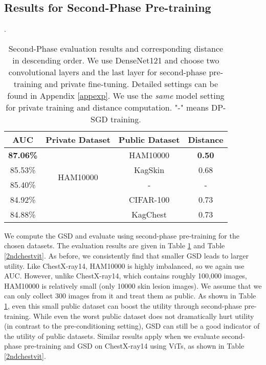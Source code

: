 \documentclass[11pt]{article}
\begin{document}
\subsection{Results for Second-Phase Pre-training} \label{sec:sppt}

\begin{table}[!h]
\caption{Second-Phase evaluation results and corresponding distance in descending order. We use DenseNet121 and choose two convolutional layers and the last layer for second-phase pre-training and private fine-tuning. Detailed settings can be found in Appendix \ref{appexp}. We use the \emph{{same}} model setting for private training and distance computation. "-" means DP-SGD training.}.
\centering
\begin{tabular}{cccc}
\hline
AUC              & Private Dataset           & Public Dataset & Distance      \\ \hline
\textbf{87.06\%} & \multirow{4}{*}{HAM10000} & HAM10000   & \textbf{0.50} \\ \cline{1-1} \cline{3-4} 
85.53\%          &                           & KagSkin        & 0.68          \\ \cline{1-1} \cline{3-4} 
85.40\%          &                           & -              & -             \\ \cline{1-1} \cline{3-4} 
84.92\%          &                           & CIFAR-100      & 0.73          \\ \cline{1-1} \cline{3-4} 
84.88\%          &                           & KagChest       & 0.73          \\ \hline
\end{tabular}
\label{2ndhamdensenet}
\end{table}

We compute the GSD and evaluate using second-phase pre-training for the chosen datasets. The evaluation results are given in Table \ref{2ndhamdensenet} and Table \ref{2ndchestvit}.
As before, we consistently find that smaller GSD leads to larger utility.
Like ChestX-ray14, HAM10000 is highly imbalanced, so we again use AUC. However, unlike ChestX-ray14, which contains roughly 100,000 images, HAM10000 is relatively small (only 10000 skin lesion images). We assume that we can only collect 300 images from it and treat them as public. As shown in Table \ref{2ndhamdensenet}, even this small public dataset can boost the utility through second-phase pre-training.  While even the worst public dataset does not dramatically hurt utility (in contrast to the pre-conditioning setting), GSD can still be a good indicator of the utility of public datasets. Similar results apply when we evaluate second-phase pre-training and GSD on ChestX-ray14 using ViTs, as shown in Table \ref{2ndchestvit}.
\end{document}
